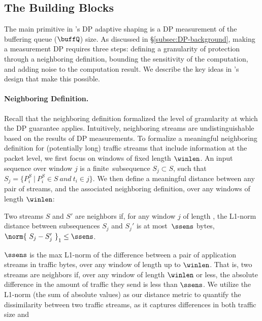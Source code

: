 \subsection{The Building Blocks}
\label{subsec:building-blocks}

The main primitive in \sys's DP adaptive shaping is a DP measurement of the
buffering queue ($\buffQ$) size.
As discussed in \S\ref{subsec:DP-background}, making a measurement DP requires
three steps: defining a granularity of protection through a neighboring
definition, bounding the sensitivity of the computation, and adding noise to the
computation result.
We describe the key ideas in \sys's design that make this possible.

\paragraph{Neighboring Definition.}
Recall that the neighboring definition formalized the level of granularity at which
the DP guarantee applies. Intuitively, neighboring streams are undistinguishable based
on the results of DP measurements.
%
To formalize a meaningful neighboring definition for  (potentially long) traffic
streams that include information at the packet level, we first focus on windows
of fixed length $\winlen$.
An input sequence over window $j$ is a finite~sub\-sequence $S_{j} \subset S$,
such that $S_{j} = \{ P^S_i~|~P^S_i \in S~and~t_i \in j \}$.
We then define a meaningful distance between any pair of streams, and the
associated neighboring definition, over any windows of length $\winlen$:

\begin{definition}
Two streams $S$ and $S'$ are neighbors if, for any window $j$ of length
  , the L1-norm distance between sub\-sequences  $S_{j}$
  and $S_{j}'$ is at most~$\ssens$ bytes, \ie ${\norm{~S_{j} - S_{j}'~}}_1 \leq \ssens$.
\label{def:neighboring-streams}
\end{definition}

$\ssens$ is the max L1-norm of the difference between a pair of application
streams in traffic bytes, over any window of length up to $\winlen$.
That is, two streams are neighbors if, over any window of length $\winlen$ or less,
the absolute difference in the amount of traffic they send is less than $\ssens$.
We utilize the L1-norm (the sum of absolute values) as our distance metric
to quantify the dissimilarity between two traffic streams, as it captures
differences in both traffic size and 

